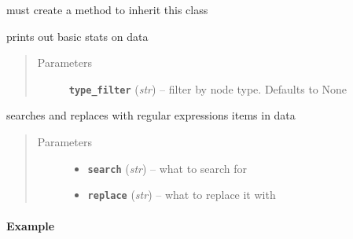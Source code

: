 \documentclass[letterpaper,10pt,english]{sphinxmanual}
\begin{document}
\begin{fulllineitems}

\begin{fulllineitems}
\label{zBuilder:zBuilder.nodeCollection.NodeCollection.retrieve_from_scene}
must create a method to inherit this class

\end{fulllineitems}


\begin{fulllineitems}
\label{zBuilder:zBuilder.nodeCollection.NodeCollection.stats}
prints out basic stats on data
\begin{quote}\begin{description}
\item[{Parameters}] \leavevmode
\textbf{\texttt{type\_filter}} (\emph{str}) -- filter by node type.  Defaults to None

\end{description}\end{quote}

\end{fulllineitems}


\begin{fulllineitems}
\label{zBuilder:zBuilder.nodeCollection.NodeCollection.string_replace}
searches and replaces with regular expressions items in data
\begin{quote}\begin{description}
\item[{Parameters}] \leavevmode\begin{itemize}
\item {} 
\textbf{\texttt{search}} (\emph{str}) -- what to search for

\item {} 
\textbf{\texttt{replace}} (\emph{str}) -- what to replace it with

\end{itemize}

\end{description}\end{quote}
\paragraph{Example}


\end{fulllineitems}
\end{fulllineitems}
\end{document}
